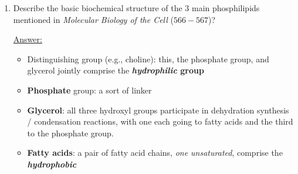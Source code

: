 \documentclass{article}
\newenvironment{QandA}{\begin{enumerate}[label=\bfseries Q\arabic*.]}
                       {\end{enumerate}}
\newenvironment{answered}{\par\normalfont\underline{Answer:}}{}
\begin{document}
\begin{QandA}
\begin{answered}
\begin{itemize}
      \item{Phosphatidyl\textit{serine}}
      \item{Phosphatidyl\textit{choline}}
      \item{Phosphatidyl\textit{ethanolamine}}
    \end{itemize}
    \end{answered}
  \item{Describe the basic biochemical structure of the 3 main phosphilipids mentioned in \textit{Molecular Biology of the Cell} ($566-567$)?}
    \begin{answered}
    \begin{itemize}
      \item{Distinguishing group (e.g., choline): this, the phosphate group, and glycerol jointly comprise the \textbf{\textit{hydrophilic}  group}}
      \item{\textbf{Phosphate} group: a sort of linker}
      \item{\textbf{Glycerol}: all three hydroxyl groups participate in dehydration synthesis / condensation reactions, with one each going to fatty acids and the third to the phosphate group.}
      \item{\textbf{Fatty acids}: a pair of fatty acid chains, \textit{one unsaturated}, comprise the \textbf{\textit{hydrophobic} }}
    \end{itemize}
    \end{answered}
\end{QandA}
\end{document}
